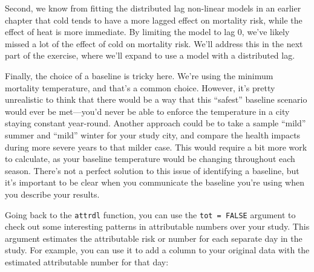 \documentclass[
]{book}
\newenvironment{Shaded}{\begin{snugshade}}{\end{snugshade}}
\newcommand{\DataTypeTok}[1]{\textcolor[rgb]{0.13,0.29,0.53}{#1}}
\newcommand{\DecValTok}[1]{\textcolor[rgb]{0.00,0.00,0.81}{#1}}
\newcommand{\KeywordTok}[1]{\textcolor[rgb]{0.13,0.29,0.53}{\textbf{#1}}}
\newcommand{\NormalTok}[1]{#1}
\newcommand{\OperatorTok}[1]{\textcolor[rgb]{0.81,0.36,0.00}{\textbf{#1}}}
\newcommand{\OtherTok}[1]{\textcolor[rgb]{0.56,0.35,0.01}{#1}}
\newcommand{\StringTok}[1]{\textcolor[rgb]{0.31,0.60,0.02}{#1}}
\begin{document}
Second, we know from fitting the distributed lag non-linear models in an earlier chapter that cold tends to have a more lagged effect on mortality risk, while the effect of heat is more immediate. By limiting the model to lag 0, we've likely missed a lot of the effect of cold on mortality risk. We'll address this in the next part of the exercise, where we'll expand to use a model with a distributed lag.

Finally, the choice of a baseline is tricky here. We're using the minimum mortality temperature, and that's a common choice. However, it's pretty unrealistic to think that there would be a way that this ``safest'' baseline scenario would ever be met---you'd never be able to enforce the temperature in a city staying constant year-round. Another approach could be to take a sample ``mild'' summer and ``mild'' winter for your study city, and compare the health impacts during more severe years to that milder case. This would require a bit more work to calculate, as your baseline temperature would be changing throughout each season. There's not a perfect solution to this issue of identifying a baseline, but it's important to be clear when you communicate the baseline you're using when you describe your results.

Going back to the \texttt{attrdl} function, you can use the \texttt{tot\ =\ FALSE} argument to check out some interesting patterns in attributable numbers over your study. This argument estimates the attributable risk or number for each separate day in the study. For example, you can use it to add a column to your original data with the estimated attributable number for that day:

\begin{Shaded}
\end{Shaded}
\end{document}
